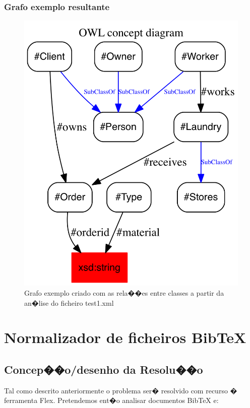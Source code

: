 \documentclass{report}
\begin{document}
\subsection{Grafo exemplo resultante}
\begin{figure}[H]
\centering
\includegraphics[width=0.5\columnwidth]{PNG/ex1}
\caption{Grafo exemplo criado com as rela��es entre classes a partir da an�lise do ficheiro test1.xml }
\label{fig:ex1}
\end{figure}




\chapter{Normalizador de ficheiros BibTeX}
\label{normalizador}


\section{Concep��o/desenho da Resolu��o}
Tal como descrito anteriormente o problema ser� resolvido com recurso � ferramenta Flex. 
Pretendemos ent�o analisar documentos BibTeX e:
\end{document}
